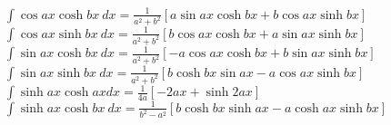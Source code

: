 \documentclass[10pt,landscape,a4paper]{article}
\begin{document}
\begin{multicols*}{3}
$
\int \cos ax \cosh bx\ dx = 
\frac{1}{a^2 + b^2} \left[
a \sin ax \cosh bx  + b \cos ax \sinh bx
\right] 
$\\

$
\int \cos ax \sinh bx\ dx = 
\frac{1}{a^2 + b^2} \left[
b \cos ax \cosh bx +
 a \sin ax \sinh bx
\right] 
$\\

$
\int \sin ax \cosh bx \ dx = 
\frac{1}{a^2 + b^2} \left[
-a \cos ax \cosh bx +
 b \sin ax \sinh bx
\right] 
$\\

$
\int \sin ax \sinh bx \ dx = 
\frac{1}{a^2 + b^2} \left[
b \cosh bx \sin ax -
 a \cos ax \sinh bx
\right] 
$\\

$
\int \sinh ax \cosh ax dx= 
\frac{1}{4a}\left[ 
-2ax + \sinh 2ax \right]
$\\

$
\int \sinh ax \cosh bx \ dx = 
\frac{1}{b^2-a^2}\left[ 
b \cosh bx \sinh ax 
- a \cosh ax \sinh bx \right]
$\\

\end{multicols*}
\end{document}
